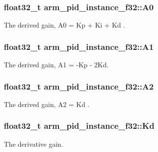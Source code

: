 \subsubsection[{\texorpdfstring{A0}{A0}}]{\setlength{\rightskip}{0pt plus 5cm}float32\+\_\+t arm\+\_\+pid\+\_\+instance\+\_\+f32\+::\+A0}\hypertarget{structarm__pid__instance__f32_ad7b0bed64915d0a25a3409fa2dc45556}{}\label{structarm__pid__instance__f32_ad7b0bed64915d0a25a3409fa2dc45556}
The derived gain, A0 = Kp + Ki + Kd . 
\subsubsection[{\texorpdfstring{A1}{A1}}]{\setlength{\rightskip}{0pt plus 5cm}float32\+\_\+t arm\+\_\+pid\+\_\+instance\+\_\+f32\+::\+A1}\hypertarget{structarm__pid__instance__f32_a7def89571c50f7137a213326a396e560}{}\label{structarm__pid__instance__f32_a7def89571c50f7137a213326a396e560}
The derived gain, A1 = -\/\+Kp -\/ 2\+Kd. 
\subsubsection[{\texorpdfstring{A2}{A2}}]{\setlength{\rightskip}{0pt plus 5cm}float32\+\_\+t arm\+\_\+pid\+\_\+instance\+\_\+f32\+::\+A2}\hypertarget{structarm__pid__instance__f32_a155acf642ba2f521869f19d694cd7fa0}{}\label{structarm__pid__instance__f32_a155acf642ba2f521869f19d694cd7fa0}
The derived gain, A2 = Kd . 
\subsubsection[{\texorpdfstring{Kd}{Kd}}]{\setlength{\rightskip}{0pt plus 5cm}float32\+\_\+t arm\+\_\+pid\+\_\+instance\+\_\+f32\+::\+Kd}\hypertarget{structarm__pid__instance__f32_ad5b68fbf84d16188ae4747ff91f6f088}{}\label{structarm__pid__instance__f32_ad5b68fbf84d16188ae4747ff91f6f088}
The derivative gain. 

